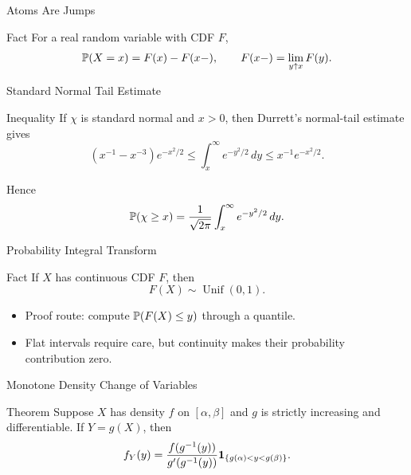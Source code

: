 \begin{frame}{Atoms Are Jumps}
  \begin{block}{Fact}
    For a real random variable with CDF $F$,
    \[
      \mathbb{P}(X=x)=F(x)-F(x-),
      \qquad
      F(x-)=\lim_{y\uparrow x}F(y).
    \]
  \end{block}
\end{frame}

\begin{frame}{Standard Normal Tail Estimate}
  \begin{block}{Inequality}
    If $\chi$ is standard normal and $x>0$, then Durrett's normal-tail estimate gives
    \[
      (x^{-1}-x^{-3})e^{-x^2/2}
      \le
      \int_x^\infty e^{-y^2/2}\,dy
      \le
      x^{-1}e^{-x^2/2}.
    \]
  \end{block}
  Hence
  \[
    \mathbb{P}(\chi\ge x)=\frac{1}{\sqrt{2\pi}}\int_x^\infty e^{-y^2/2}\,dy.
  \]
\end{frame}

\begin{frame}{Probability Integral Transform}
  \begin{block}{Fact}
    If $X$ has continuous CDF $F$, then
    \[
      F(X)\sim \operatorname{Unif}(0,1).
    \]
  \end{block}
  \begin{itemize}
    \item Proof route: compute $\mathbb{P}(F(X)\le y)$ through a quantile.
    \item Flat intervals require care, but continuity makes their probability contribution zero.
  \end{itemize}
\end{frame}

\begin{frame}{Monotone Density Change of Variables}
  \begin{block}{Theorem}
    Suppose $X$ has density $f$ on $[\alpha,\beta]$ and $g$ is strictly increasing and differentiable. If $Y=g(X)$, then
    \[
      f_Y(y)=
      \frac{f(g^{-1}(y))}{g'(g^{-1}(y))}
      \mathbf{1}_{\{g(\alpha)<y<g(\beta)\}}.
    \]
  \end{block}
\end{frame}

